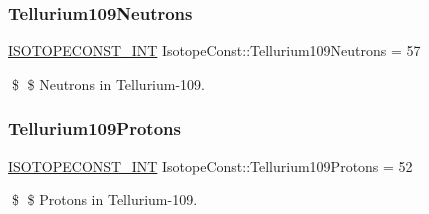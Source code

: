 \subsubsection{\texorpdfstring{Tellurium109\+Neutrons}{Tellurium109Neutrons}}
{\footnotesize\ttfamily \mbox{\hyperlink{group___isotope_const-_macros_ga5f18360b3e99483a35c32d789e62621c}{I\+S\+O\+T\+O\+P\+E\+C\+O\+N\+S\+T\+\_\+\+I\+NT}} Isotope\+Const\+::\+Tellurium109\+Neutrons = 57}

\$ \$ Neutrons in Tellurium-\/109. \mbox{\label{group___isotope_const-_tellurium-_te109_gaa470a06a9c0071bd0262cb53ae79ac35}} 
\subsubsection{\texorpdfstring{Tellurium109\+Protons}{Tellurium109Protons}}
{\footnotesize\ttfamily \mbox{\hyperlink{group___isotope_const-_macros_ga5f18360b3e99483a35c32d789e62621c}{I\+S\+O\+T\+O\+P\+E\+C\+O\+N\+S\+T\+\_\+\+I\+NT}} Isotope\+Const\+::\+Tellurium109\+Protons = 52}

\$ \$ Protons in Tellurium-\/109. 